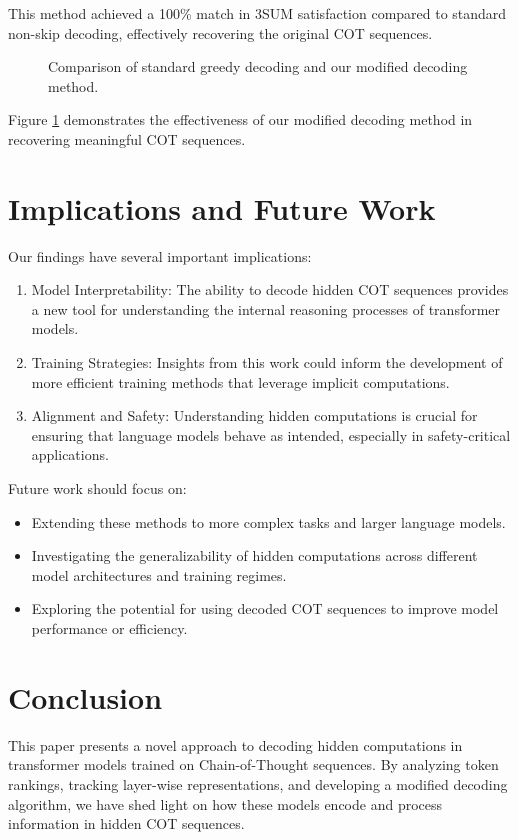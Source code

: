 \documentclass[11pt,a4paper]{article}
\begin{document}
This method achieved a 100\% match in 3SUM satisfaction compared to standard non-skip decoding, effectively recovering the original COT sequences.

\begin{figure}[h]
\centering
{}
\caption{Comparison of standard greedy decoding and our modified decoding method.}
\label{fig:decoding_comparison}
\end{figure}

Figure \ref{fig:decoding_comparison} demonstrates the effectiveness of our modified decoding method in recovering meaningful COT sequences.

\section{Implications and Future Work}
Our findings have several important implications:

\begin{enumerate}
    \item Model Interpretability: The ability to decode hidden COT sequences provides a new tool for understanding the internal reasoning processes of transformer models.
    \item Training Strategies: Insights from this work could inform the development of more efficient training methods that leverage implicit computations.
    \item Alignment and Safety: Understanding hidden computations is crucial for ensuring that language models behave as intended, especially in safety-critical applications.
\end{enumerate}

Future work should focus on:
\begin{itemize}
    \item Extending these methods to more complex tasks and larger language models.
    \item Investigating the generalizability of hidden computations across different model architectures and training regimes.
    \item Exploring the potential for using decoded COT sequences to improve model performance or efficiency.
\end{itemize}

\section{Conclusion}
This paper presents a novel approach to decoding hidden computations in transformer models trained on Chain-of-Thought sequences. By analyzing token rankings, tracking layer-wise representations, and developing a modified decoding algorithm, we have shed light on how these models encode and process information in hidden COT sequences.
\end{document}
